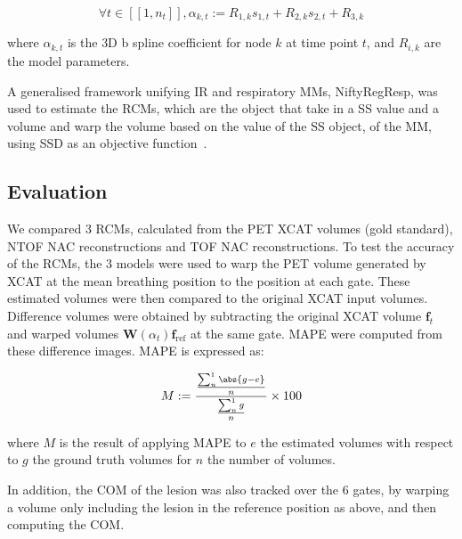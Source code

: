                \begin{equation}
                    \forall t \in [[1,n_t]], \alpha_{k,t} := R_{1,k} s_{1,t} + R_{2,k} s_{2,t} + R_{3,k}
                \end{equation}
                
                \noindent where $\alpha_{k,t}$ is the \gls{3D} b spline coefficient for node $k$ at time point $t$, and $R_{i,k}$ are the model parameters.
            
                A generalised framework unifying \gls{IR} and respiratory \gls{MM}s, NiftyRegResp, was used to estimate the \gls{RCM}s, which are the object that take in a \gls{SS} value and a volume and warp the volume based on the value of the \gls{SS} object, of the \gls{MM}, using \gls{SSD} as an objective function~.
                
            \subsection{Evaluation} \label{impact_of_tof_on_respiratory_motion_modelling_using_nac_pet_methods_evaluation}
                We compared $3$ \gls{RCM}s, calculated from the \gls{PET} \gls{XCAT} volumes (gold standard), \gls{NTOF} \gls{NAC} reconstructions and \gls{TOF} \gls{NAC} reconstructions. To test the accuracy of the \gls{RCM}s, the $3$ models were used to warp the \gls{PET} volume generated by \gls{XCAT} at the mean breathing position to the position at each gate. These estimated volumes were then compared to the original \gls{XCAT} input volumes. Difference volumes were obtained by subtracting the original \gls{XCAT} volume $\mathbf{f}_t$ and warped volumes $\mathbf{W}(\alpha_t) \mathbf{f}_\mathrm{ref}$ at the same gate. \gls{MAPE} were computed from these difference images. \gls{MAPE} is expressed as:
                
                \begin{equation}
                    M := \frac{\frac{\sum_{n}^{1}\abs{g - e}}{n}}{\frac{\sum_{n}^{1}g}{n}} \times 100
                \end{equation}
                
                \noindent where $M$ is the result of applying \gls{MAPE} to $e$ the estimated volumes with respect to $g$ the ground truth volumes for $n$ the number of volumes.
                
                In addition, the \gls{COM} of the lesion was also tracked over the $6$ gates, by warping a volume only including the lesion in the reference position as above, and then computing the \gls{COM}.
            
